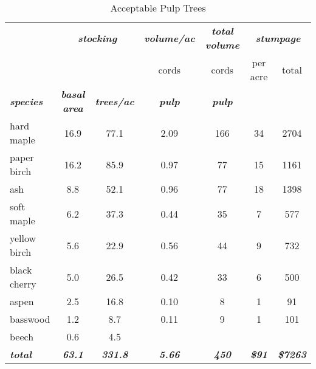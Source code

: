 \documentclass[landscape]{article}
\begin{document}
\begin{table}[H]

\caption{\label{tab:unnamed-chunk-56}Acceptable Pulp Trees}
\fontsize{10}{12}\selectfont
\begin{tabular}[t]{lcccccc}
\toprule
\multicolumn{1}{c}{\em{\textbf{ }}} & \multicolumn{2}{c}{\em{\textbf{stocking}}} & \multicolumn{1}{c}{\em{\textbf{volume/ac }}} & \multicolumn{1}{c}{\em{\textbf{total volume}}} & \multicolumn{2}{c}{\em{\textbf{stumpage}}} \\
\cmidrule(l{3pt}r{3pt}){2-3} \cmidrule(l{3pt}r{3pt}){4-4} \cmidrule(l{3pt}r{3pt}){5-5} \cmidrule(l{3pt}r{3pt}){6-7}
\multicolumn{3}{c}{ } & \multicolumn{1}{c}{cords} & \multicolumn{1}{c}{cords} & \multicolumn{1}{c}{per acre} & \multicolumn{1}{c}{total} \\
\cmidrule(l{3pt}r{3pt}){4-4} \cmidrule(l{3pt}r{3pt}){5-5} \cmidrule(l{3pt}r{3pt}){6-6} \cmidrule(l{3pt}r{3pt}){7-7}
\rowcolor[HTML]{DCDCDC}  \em{\textbf{species}} & \em{\textbf{basal area}} & \em{\textbf{trees/ac}} & \em{\textbf{pulp}} & \em{\textbf{pulp}} & \em{\textbf{ }} & \em{\textbf{ }}\\
\midrule
\rowcolor{gray!6}  hard maple & 16.9 & 77.1 & 2.09 & 166 & 34 & 2704\\
 
paper birch & 16.2 & 85.9 & 0.97 & 77 & 15 & 1161\\
 
\rowcolor{gray!6}  ash & 8.8 & 52.1 & 0.96 & 77 & 18 & 1398\\
 
soft maple & 6.2 & 37.3 & 0.44 & 35 & 7 & 577\\
 
\rowcolor{gray!6}  yellow birch & 5.6 & 22.9 & 0.56 & 44 & 9 & 732\\
 
black cherry & 5.0 & 26.5 & 0.42 & 33 & 6 & 500\\
 
\rowcolor{gray!6}  aspen & 2.5 & 16.8 & 0.10 & 8 & 1 & 91\\
 
basswood & 1.2 & 8.7 & 0.11 & 9 & 1 & 101\\
 
\rowcolor{gray!6}  beech & 0.6 & 4.5 &  &  &  & \\
 
\rowcolor[HTML]{DCDCDC}  \em{\textbf{total}} & \em{\textbf{63.1}} & \em{\textbf{331.8}} & \em{\textbf{5.66}} & \em{\textbf{450}} & \em{\textbf{\$91}} & \em{\textbf{\$7263}}\\
\bottomrule
\end{tabular}
\end{table}
\end{document}
